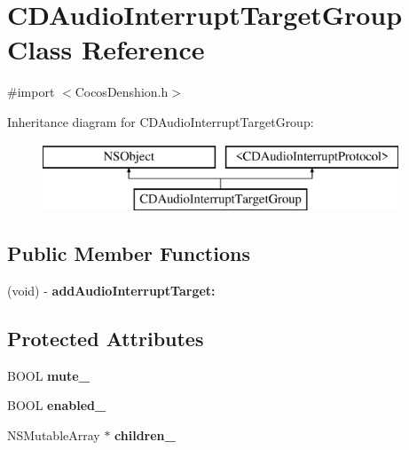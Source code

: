 \hypertarget{interface_c_d_audio_interrupt_target_group}{\section{C\-D\-Audio\-Interrupt\-Target\-Group Class Reference}
\label{interface_c_d_audio_interrupt_target_group}
}


{\ttfamily \#import $<$Cocos\-Denshion.\-h$>$}

Inheritance diagram for C\-D\-Audio\-Interrupt\-Target\-Group\-:\begin{figure}[H]
\begin{center}
\leavevmode
\includegraphics[height=2.000000cm]{interface_c_d_audio_interrupt_target_group}
\end{center}
\end{figure}
\subsection*{Public Member Functions}
\begin{DoxyCompactItemize}
\item 
\hypertarget{interface_c_d_audio_interrupt_target_group_adaea03ff50fe3ae6338967665161b4e3}{(void) -\/ {\bfseries add\-Audio\-Interrupt\-Target\-:}}\label{interface_c_d_audio_interrupt_target_group_adaea03ff50fe3ae6338967665161b4e3}

\end{DoxyCompactItemize}
\subsection*{Protected Attributes}
\begin{DoxyCompactItemize}
\item 
\hypertarget{interface_c_d_audio_interrupt_target_group_a0c21f03d4f292be83b2bc6367f0cb455}{B\-O\-O\-L {\bfseries mute\-\_\-}}\label{interface_c_d_audio_interrupt_target_group_a0c21f03d4f292be83b2bc6367f0cb455}

\item 
\hypertarget{interface_c_d_audio_interrupt_target_group_ad4f3381e0b8ab006350a78d11fa60f35}{B\-O\-O\-L {\bfseries enabled\-\_\-}}\label{interface_c_d_audio_interrupt_target_group_ad4f3381e0b8ab006350a78d11fa60f35}

\item 
\hypertarget{interface_c_d_audio_interrupt_target_group_aaf657e175d2d934e8e2a197479c6cb74}{N\-S\-Mutable\-Array $\ast$ {\bfseries children\-\_\-}}\label{interface_c_d_audio_interrupt_target_group_aaf657e175d2d934e8e2a197479c6cb74}

\end{DoxyCompactItemize}


